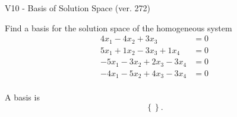 \begin{exercise}
  \begin{exerciseTitle}V10 - Basis of Solution Space (ver. 272)\end{exerciseTitle}
  \begin{exerciseStatement}
    Find a basis for the solution space of the homogeneous system 
\begin{align*}
 4 x_ 1 -4 x_ 2 + 3 x_ 3 &= 0  \\ 
  5 x_ 1 + 1 x_ 2 -3 x_ 3 + 1 x_ 4 &= 0  \\ 
  -5 x_ 1 -3 x_ 2 + 2 x_ 3 -3 x_ 4 &= 0  \\ 
  -4 x_ 1 -5 x_ 2 + 4 x_ 3 -3 x_ 4 &= 0  \\ 
 \end{align*}


 
  \end{exerciseStatement}

  \begin{exerciseAnswer}
   A basis is   
\[\left\{\right\}.\]

  


  \end{exerciseAnswer}
\end{exercise}